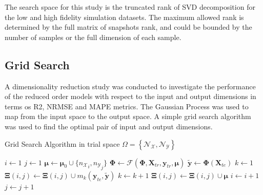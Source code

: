 The search space for this study is the truncated rank of SVD decomposition for the low and high fidelity simulation datasets. The maximum allowed rank is determined by the full matrix of snapshots rank, and could be bounded by the number of samples or the full dimension of each sample. 

\subsection{Grid Search}

A dimensionality reduction study was conducted to investigate the performance of the reduced order models with respect to the input and output dimensions in terms os R2, NRMSE and MAPE metrics. The Gaussian Process was used to map from the input space to the output space. A simple grid search algorithm was used to find the optimal pair of input and output dimensions.

\begin{algorithm}
    \caption{Grid Search Algorithm in trial space $\Omega = \left\{\mathcal{N_X}, \mathcal{N_Y}\right\} $}
    \label{alg:grid_search}
    \begin{algorithmic}[1]
        \State $i \gets 1$
        \State $j \gets 1$
                \State $\boldsymbol{\mu} \gets \boldsymbol{\mu}_0 \cup \{{n_{\mathcal{X}}}_i,  {n_{\mathcal{Y}}}_j\}$
                \State $\mathbf{\Phi} \gets  \mathcal{F}(\mathbf{\Phi},\mathbf{X}_{tr}, \mathbf{y}_{tr} , \boldsymbol{\mu})$
                \State $\tilde{\mathbf{y}} \gets \mathbf{\Phi}(\mathbf{X}_{te})$
                \State $k \gets 1$
                    \State $\mathbf{\Xi}(i,j) \gets \mathbf{\Xi}(i,j) \cup m_k(\mathbf{y}_{te}, \tilde{\mathbf{y}})$
                    \State $k \gets k + 1$
                \EndFor
                \State $\mathbf{\Xi}(i,j) \gets \mathbf{\Xi}(i,j) \cup \boldsymbol{\mu}$     
                \State $i \gets i + 1$
            \EndFor
            \State $j \gets j + 1$
        \EndFor
    \end{algorithmic}
\end{algorithm}

